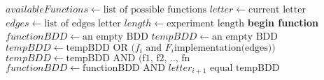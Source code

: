 \documentclass{article}      %
\newcounter{ct}
\begin{document}
\begin{algorithm}
\begin{algorithmic}[1]
\State $availableFunctions \gets \text{list of possible functions}$
\State $letter \gets \text{current letter}$
\State $edges \gets \text{list of edges letter}$
\State $length \gets \text{experiment length}$
\State \textbf{begin function}
\State $functionBDD \gets \text{an empty BDD}$
        \State $tempBDD \gets \text{an empty BDD}$
            \State $tempBDD \gets \text{tempBDD OR ($f_i$ and $F_i$implementation(edges))}$
            \State {}
        \EndFor
        \State $tempBDD \gets \text{tempBDD AND (f1, f2, .., fn}$
        \State {}
        \State $functionBDD \gets \text{functionBDD AND $letter_{i+1}$ equal tempBDD}$
    \EndFor
    \State {}
\EndFunction
\end{algorithmic}
\end{algorithm}
\end{document}
